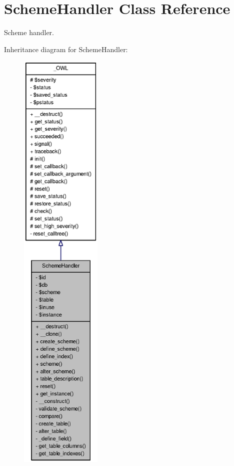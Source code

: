 \section{SchemeHandler Class Reference}
\label{classSchemeHandler}


Scheme handler.  




Inheritance diagram for SchemeHandler:\nopagebreak
\begin{figure}[H]
\begin{center}
\leavevmode
\includegraphics[height=600pt]{classSchemeHandler__inherit__graph}
\end{center}
\end{figure}



